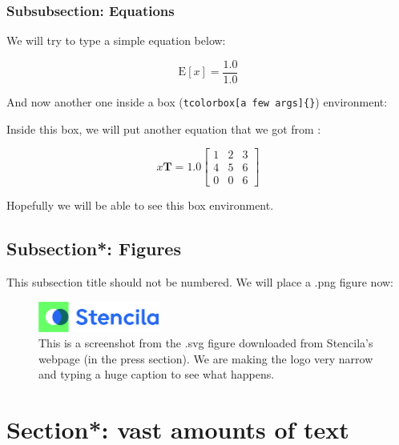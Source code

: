 \documentclass[oneside]{article}
\begin{document}
\subsubsection{Subsubsection: Equations}

We will try to type a simple equation below:

\begin{equation}
  \text{E}[x] = \frac{1.0}{1.0}
  \label{eq:eq1}
\end{equation}

And now another one inside a box (\texttt{tcolorbox[a few
  args]\{\}}) environment:

\begin{tcolorbox}[breakable, width=\textwidth, colback=gray!10, boxrule=0pt,
  title=Box 1: A box title fonttitle=\bfseries]
  \small

  Inside this box, we will put another equation that we got from
  \citealt{article2}:

  \begin{equation}
    x\mathbf{T} = 1.0
    \begin{bmatrix}
      1 & 2 & 3\\
      4 & 5 & 6\\
      0 & 0 & 6
    \end{bmatrix}
    \label{eq:eq2}
  \end{equation}

  Hopefully we will be able to see this box environment.
\end{tcolorbox}

\subsection*{Subsection*: Figures}

This subsection title should not be numbered.
We will place a .png figure now:

\begin{figure}[ht!]
  \includegraphics[width=4cm]{image.png}
  \caption{This is a screenshot from the .svg figure
    downloaded from Stencila's webpage (in the press
    section).
  We are making the logo very narrow and typing a huge
  caption to see what happens.}
  \label{fig:pnglogo}
\end{figure}


\section*{Section*: vast amounts of text}

\blindtext[4]


\end{document}
